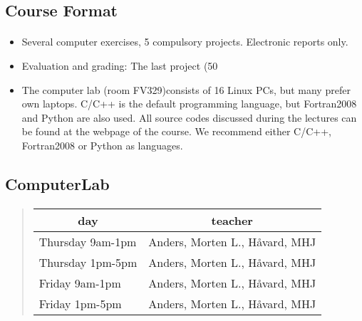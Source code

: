 \documentclass[%
twoside,                 %
final,                   %
10pt]{article}
\begin{document}
\noindent



\subsection*{Course Format}


\paragraph{}
\begin{itemize}
  \item Several computer exercises, 5 compulsory projects. Electronic reports only.

  \item Evaluation and grading: The last project (50%

  \item The computer lab (room FV329)consists of 16 Linux PCs, but many prefer own laptops. C/C++ is the default programming language, but Fortran2008 and Python are also used. All source codes discussed during the lectures can be found at the webpage of the course. We recommend either C/C++, Fortran2008 or Python as languages.
\end{itemize}

\noindent



\subsection*{ComputerLab}


\paragraph{}


\begin{quote}
\begin{tabular}{ll}
\hline
\multicolumn{1}{c}{ day } & \multicolumn{1}{c}{ teacher } \\
\hline
Thursday 9am-1pm & Anders, Morten L., Håvard, MHJ \\
Thursday 1pm-5pm & Anders, Morten L., Håvard, MHJ \\
Friday 9am-1pm   & Anders, Morten L., Håvard, MHJ \\
Friday 1pm-5pm   & Anders, Morten L., Håvard, MHJ \\
\hline
\end{tabular}
\end{quote}
\end{document}
